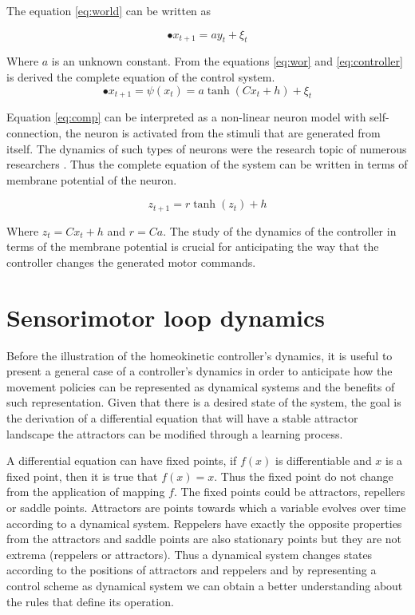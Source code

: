 \documentclass[msc,ai,logo]{infthesis}
\begin{document}
 The equation \ref{eq:world} can be written as 
 
 \begin{equation}
 \label{eq:wor}
•x_{t+1}=a y_{t}+ \xi_{t}
\end{equation}
 
Where $a$ is an unknown constant. From the equations \ref{eq:wor} and \ref{eq:controller} is derived the complete equation of the control system.
\begin{equation}
\label{eq:comp}
•x_{t+1}=\psi(x_t) = a \tanh(Cx_{t}+h)+ \xi_{t}
\end{equation}

Equation \ref{eq:comp} can be interpreted as a non-linear neuron model with self-connection, the neuron is activated from the stimuli that are generated from itself. The dynamics of such types of neurons were the research topic of numerous researchers \citep{Renals,Pasemann1993}. Thus the complete equation of the system can be written in terms of membrane potential of the neuron.

\begin{equation}
z_{t+1}=r \tanh(z_{t})+h
\label{eq:potential}
\end{equation}

Where $z_{t}=Cx_{t}+h$ and $r=Ca$. The study of the dynamics of the controller in terms of the membrane potential is crucial for anticipating the way that the controller changes the generated motor commands.

\section{Sensorimotor loop dynamics}

Before the illustration of the homeokinetic controller's  dynamics, it is useful to present a general case of a controller's dynamics in order to anticipate how the movement policies can be represented as dynamical systems and the benefits of such representation. Given that there is a desired state of the system, the goal is the derivation of a differential equation that will have a stable attractor landscape the attractors can be modified through a learning process.

A differential equation can have fixed points, if $f(x)$ is differentiable and $x$ is a fixed point, then it is true that $f(x)=x$. Thus the fixed point do not change from the application of mapping $f$. The fixed points could be attractors, repellers or saddle points. Attractors are points towards which a variable evolves over time according to a dynamical system. Reppelers have exactly the opposite properties from the attractors and saddle points are also stationary points but they are not extrema (reppelers or attractors). Thus a dynamical system changes states according to the positions of attractors and reppelers and by representing a control scheme as dynamical system we can obtain a better understanding about the rules that define its operation.
\end{document}

